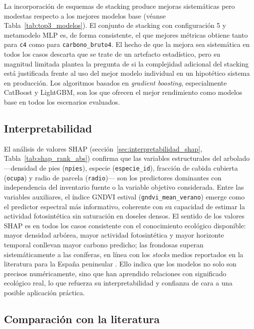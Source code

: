 La incorporación de esquemas de stacking produce mejoras sistemáticas pero modestas respecto a los mejores modelos base (véanse Tabla~\ref{tab:top3_modelos}). El conjunto de stacking con configuración 5 y metamodelo MLP es, de forma consistente, el que mejores métricas obtiene tanto para \texttt{c4} como para \texttt{carbono\_bruto4}. El hecho de que la mejora sea sistemática en todos los casos descarta que se trate de un artefacto estadístico, pero su magnitud limitada plantea la pregunta de si la complejidad adicional del stacking está justificada frente al uso del mejor modelo individual en un hipotético sistema en producción. Los algoritmos basados en \textit{gradient boosting}, especialmente CatBoost y LightGBM, son los que ofrecen el mejor rendimiento como modelos base en todos los escenarios evaluados.

\subsection*{Interpretabilidad}

El análisis de valores SHAP (sección~\ref{sec:interpretabilidad_shap}, Tabla~\ref{tab:shap_rank_abs}) confirma que las variables estructurales del arbolado ---densidad de pies (\texttt{npies}), especie (\texttt{especie_id}), fracción de cabida cubierta (\texttt{ocupa}) y radio de parcela (\texttt{radio})--- son los predictores dominantes con independencia del inventario fuente o la variable objetivo considerada. Entre las variables auxiliares, el índice GNDVI estival (\texttt{gndvi_mean_verano}) emerge como el predictor espectral más informativo, coherente con su capacidad de estimar la actividad fotosintética sin saturación en doseles densos. El sentido de los valores SHAP es en todos los casos consistente con el conocimiento ecológico disponible: mayor densidad arbórea, mayor actividad fotosintética y mayor horizonte temporal conllevan mayor carbono predicho; las frondosas superan sistemáticamente a las coníferas, en línea con los \textit{stocks} medios reportados en la literatura para la España peninsular \citep{vayreda2012carbon}. Ello indica que los modelos no solo son precisos numéricamente, sino que han aprendido relaciones con significado ecológico real, lo que refuerza su interpretabilidad y confianza de cara a una posible aplicación práctica.

\subsection*{Comparación con la literatura}

